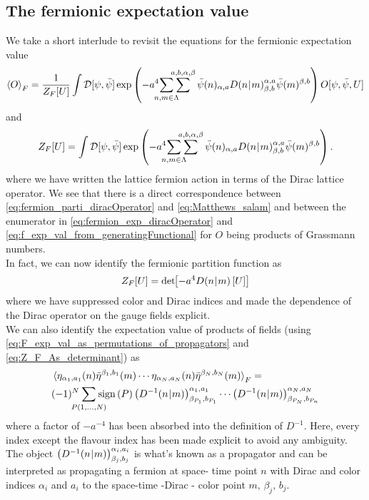 \documentclass[a4paper,10pt]{book}
\begin{document}
\subsection{The fermionic expectation value}
We take a short interlude to revisit the equations for the fermionic expectation value
\begin{equation}\label{eq:fermion_exp_diracOperator}
\braket{O}_{F}=\frac{1}{Z_{F}[U]} \int \mathcal{D}[\psi, \bar{\psi}] \exp\left( -a^4\mkern-18mu \,\,\sum\limits_{n,m\in\Lambda}\mkern-18mu\sum\limits^{a,b,\alpha,\beta} \bar{\psi}(n)_{\alpha,a}D(n\mkern-4mu\mid \mkern-4mu m)_{\beta,b}^{\alpha,a} \bar{\psi}(m)^{\beta,b}\right) O[\psi, \bar{\psi}, U]
\end{equation}
and
\begin{equation}\label{eq:fermion_parti_diracOperator}
Z_{F}[U]=\int \mathcal{D}[\psi, \bar{\psi}] \exp\left( -a^4\mkern-18mu \,\,\sum\limits_{n,m\in\Lambda}\mkern-18mu\sum\limits^{a,b,\alpha,\beta} \bar{\psi}(n)_{\alpha,a}D(n\mkern-4mu\mid \mkern-4mu m)_{\beta,b}^{\alpha,a} \bar{\psi}(m)^{\beta,b}\right).
\end{equation}
where we have written the lattice fermion action in terms of the Dirac lattice operator. We see that there is a direct correspondence between \eqref{eq:fermion_parti_diracOperator} and \eqref{eq:Matthews_salam} and between the enumerator in \eqref{eq:fermion_exp_diracOperator} and \eqref{eq:f_exp_val_from_generatingFunctional} for $O$ being products of Grassmann numbers.\\In fact, we can now identify the fermionic partition function as
\begin{equation}\label{eq:Z_F_As_determinant}
Z_{F}[U] = \operatorname{det}\mkern-5mu\left[ -a^4D(n\mkern-4mu\mid \mkern-4mu m)\left[ U \right] \right]
\end{equation}
where we have suppressed color and Dirac indices and made the dependence of the Dirac operator on the gauge fields explicit.\\We can also identify the expectation value of products of fields (using \eqref{eq:F_exp_val_as_permutations_of_propagators} and \eqref{eq:Z_F_As_determinant}) as
\begin{equation}\label{eq:fermion_exp_val_Wick}
\begin{aligned}
&\braket{\eta_{\alpha_1,a_1}(n)\bar{\eta}^{\beta_1,b_1}(m)\cdots\eta_{\alpha_N,a_N}(n)\bar{\eta}^{\beta_N,b_N}(m)}_F = \\&(-1)^N \mkern-18mu\sum\limits_{P(1,\ldots,N)}\mkern-18mu\operatorname{sign}\left( P \right)\left( D^{-1}(n\mkern-4mu\mid \mkern-4mu m) \right)_{\beta_{P_1},b_{P_1}}^{\alpha_1,a_1}\cdots\left( D^{-1}(n\mkern-4mu\mid \mkern-4mu m) \right)_{\beta_{P_N},b_{P_n}}^{\alpha_N,a_N}
\end{aligned}
\end{equation}
where a factor of $-a^{-4}$ has been absorbed into the definition of $D^{-1}$. Here, every index except the flavour index has been made explicit to avoid any ambiguity. The object $\left( D^{-1}(n\mkern-4mu\mid \mkern-4mu m) \right)_{\beta_{j},b_{j}}^{\alpha_i,a_i}$ is what's known as a propagator and can be interpreted as propagating a fermion at space- time point $n$ with Dirac and color indices $\alpha_i$ and $a_i$ to the space-time -Dirac - color point $m,\,\beta_j,\,b_j$.
\end{document}
